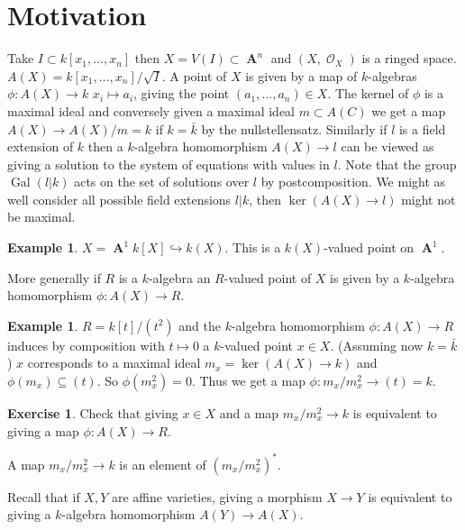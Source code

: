 \documentclass[10pt,]{book}
\theoremstyle{plain}
\theoremstyle{definition}
\newtheorem{example}[theorem]{Example}
\newtheorem{exercise}[theorem]{Exercise}
\numberwithin{equation}{section}
\DeclareMathOperator{\aff}{\mathbf{A}}
\DeclareMathOperator{\sO}{\mathcal{O}}
\DeclareMathOperator{\Gal}{Gal}
\begin{document}
\section[Motivation]{Motivation}\label{sec-motivation}
Take \(I \subset k[x_1,\ldots,x_n]\) then \(X = V(I) \subset \aff^n\) and \((X,\sO_X)\) is a ringed space.
          \(A(X) = k[x_1,\ldots,x_n]/\sqrt{I}\).
          A point of \(X\) is given by a map of \(k\)-algebras \(\phi\colon A(X) \to k\) \(x_i\mapsto a_i\), giving the point \((a_1,\ldots,a_n)\in X\).
          The kernel of \(\phi\) is a maximal ideal and conversely given a maximal ideal \(m\subset A(C)\) we get a map \(A(X) \to A(X)/m  = k\) if \(k = \bar{k}\) by the nullstellensatz.
          Similarly if \(l\) is a field extension of \(k\) then a \(k\)-algebra homomorphism \(A(X) \to l\) can be viewed as giving a solution to the system of equations with values in \(l\).
          Note that the group \(\Gal(l|k)\) acts on the set of solutions over \(l\) by postcomposition.
          We might as well consider all possible field extensions \(l|k\), then \(\ker(A(X) \to l)\) might not be maximal.
\begin{example}\label{example-1}
\(X = \aff^1\)\(k[X] \hookrightarrow k(X)\).
            This is a \(k(X)\)-valued point on \(\aff^1\).
          \end{example}
\par
More generally if \(R\) is a \(k\)-algebra an \(R\)-valued point of \(X\) is given by a \(k\)-algebra homomorphism \(\phi\colon A(X) \to R\).%
\begin{example}\label{example-2}
\(R =k[t]/(t^2)\)  and the \(k\)-algebra homomorphism \(\phi\colon A(X) \to R\) induces by composition with \(t\mapsto 0\) a \(k\)-valued point \(x\in X\). (Assuming now \(k = \bar{k}\)) \(x\) corresponds to a maximal ideal \(m_x = \ker(A(X) \to k)\) and \(\phi(m_x) \subseteq (t)\).
            So \(\phi(m_x^2) = 0\). 
            Thus we get a map \(\phi \colon m_x/m_x^2 \to (t) = k\).

            \begin{exercise}\label{exercise-1}
Check that giving \(x\in X\) and a map \(m_x/m_x^2 \to k\) is equivalent to giving a map \(\phi\colon A(X) \to R\).\end{exercise}


            A map \(m_x/m_x^2 \to k\) is an element of \((m_x/m_x^2)^*\).
          \end{example}
\par
Recall that if \(X,Y\) are affine varieties, giving a morphism \(X\to Y\) is equivalent to giving a \(k\)-algebra homomorphism \(A(Y) \to A(X)\).
\end{document}
